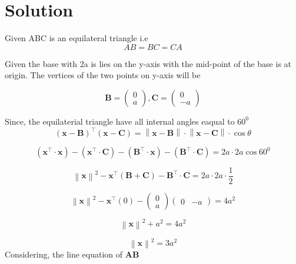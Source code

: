 \documentclass[journal,12pt,twocolumn]{IEEEtran}
\providecommand{\norm}[1]{\left\lVert#1\right\rVert}
\let\vec\mathbf
\newcommand{\myvec}[1]{\ensuremath{\begin{pmatrix}#1\end{pmatrix}}}
\providecommand{\brak}[1]{\ensuremath{\left(#1\right)}}
\begin{document}
\section{Solution}
\noindent Given ABC is an equilateral triangle i.e 
\begin{equation}
AB = BC = CA  
\end{equation}

\noindent Given the base with 2a is lies on the y-axis with the mid-point of the base is at origin. The vertices of the two points on y-axis will be

\begin{equation}
\vec{B}=\begin{pmatrix} 
0\\
a
\end{pmatrix}, {
\vec{C}=\begin{pmatrix} 
0\\
-a
\end{pmatrix} }
\end{equation}

\noindent Since, the equilaterial triangle have all internal angles eaqual to  $60^0$ 
 \begin{equation}  
  \brak{\vec{x}-\vec{B}}^{\top} \brak{\vec{x}-\vec{C}}= \norm{\vec{x}-\vec{B}} \cdot \norm{\vec{x}-\vec{C}} \cdot \cos\theta 
 \end{equation}
 
 \begin{equation}  
\brak{\vec{x}^\top \cdot \vec{x}} - \brak{\vec{x}^\top \cdot \vec{C}} - \brak{\vec{B}^\top \cdot \vec{x}} - \brak{\vec{B}^\top \cdot \vec{C}} = 2a \cdot 2a \cos 60^0   
 \end{equation}

 \begin{equation}  
\norm{\vec{x}}^2 - \vec{x}^\top\brak{\vec{B}+\vec{C}} - \vec{B}^\top \cdot \vec{C} = 2a \cdot 2a \cdot \frac{1}{2}
 \end{equation}

  \begin{equation}  
\norm{\vec{x}}^2 - \vec{x}^\top\brak{0} -\myvec{0 \\ a} \myvec{0 & -a}  = 4a^2
 \end{equation}

\begin{equation}
\norm{\vec{x}}^2 + a^2 = 4a^2
\end{equation}

\begin{equation}
\norm{\vec{x}}^2 = 3a^2
\label{eq-1}
\end{equation}
Considering, the line equation of $\vec{AB}$
\end{document}
